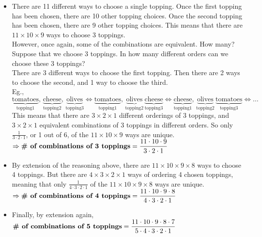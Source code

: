 \documentclass{article}
\begin{document}
\begin{itemize}
\item There are 11 different ways to choose a single topping. Once the first topping has been chosen, there are 10 other topping choices. Once the second topping has been chosen, there are 9 other topping choices. This means that there are $11\times 10\times 9$ ways to choose 3 toppings.\\[1ex]
However, once again, some of the combinations are equivalent. How many?\\[1ex]
Suppose that we choose 3 toppings. In how many different orders can we choose these 3 toppings?\\
There are 3 different ways to choose the first topping. Then there are 2 ways to choose the second, and 1 way to choose the third.\\[1ex]
Eg., $\underbrace{\text{tomatoes}}_{\text{topping1}},\,\underbrace{\text{cheese}}_{\text{topping2}},\,\underbrace{\text{olives}}_{\text{topping3}}
\Leftrightarrow\underbrace{\text{tomatoes}}_{\text{topping1}},\,\underbrace{\text{olives}}_{\text{topping2}}\,\underbrace{\text{cheese}}_{\text{topping3}}
\Leftrightarrow\underbrace{\text{cheese}}_{\text{topping1}},\,\underbrace{\text{olives}}_{\text{topping2}}\,\underbrace{\text{tomatoes}}_{\text{topping3}}
\Leftrightarrow\ldots$\\[1em]
This means that there are $3\times 2\times 1$ different orderings of 3 toppings, and $3\times 2\times 1$ equivalent combinations of 3 toppings in different orders. So only $\frac{1}{3\cdot 2\cdot 1}$, or 1 out of 6, of the $11\times 10\times 9$ ways are unique.\\[1ex]
$\Rightarrow\text{\bf\# of combinations of 3 toppings}=\dfrac{11\cdot 10\cdot 9}{3\cdot 2\cdot 1}$

\item By extension of the reasoning above, there are $11\times 10\times 9\times 8$ ways to choose 4 toppings. But there are $4\times 3\times 2\times 1$ ways of ordering 4 chosen toppings, meaning that only $\frac{1}{4\cdot 3\cdot 2\cdot 1}$ of the $11\times 10\times 9\times 8$ ways are unique.\\[1ex]
$\Rightarrow\text{\bf\# of combinations of 4 toppings}=\dfrac{11\cdot 10\cdot 9\cdot 8}{4\cdot 3\cdot 2\cdot 1}$

\item Finally, by extension again,\\[1ex]
$\text{\bf\# of combinations of 5 toppings}=\dfrac{11\cdot 10\cdot 9\cdot 8\cdot 7}{5\cdot 4\cdot 3\cdot 2\cdot 1}$
\end{itemize}
\end{document}
